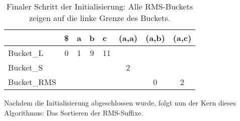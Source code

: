 \begin{table}
	\begin{tabular}[t]{l|c|c|c|c|c|c|c|}
		\cline{2-8}
		& \multicolumn{1}{l|}{\$} & \multicolumn{1}{l|}{a} & \multicolumn{1}{l|}{b} & \multicolumn{1}{l|}{c} & \multicolumn{1}{l|}{(a,a)} & \multicolumn{1}{l|}{(a,b)} & \multicolumn{1}{l|}{(a,c)} \\ \hline
		\multicolumn{1}{|l|}{Bucket\_L}   & 0                       & 1                      & 9                      & 11                     &                            &                            &                            \\ \hline
		\multicolumn{1}{|l|}{Bucket\_S}   &                         &                        &                        &                        & 2                          &                            &                            \\ \hline
		\multicolumn{1}{|l|}{Bucket\_RMS} &                         &                        &                        &                        &                            & \cellcolor[HTML]{32CB00}0  & \cellcolor[HTML]{32CB00}2  \\ \hline
	\end{tabular}
	\caption{Finaler Schritt der Initialisierung: Alle RMS-Buckets zeigen auf die linke Grenze des Buckets.}
\end{table}

Nachdem die Initialisierung abgeschlossen wurde, folgt nun der Kern dieses Algorithmus: Das Sortieren der RMS-Suffixe.

